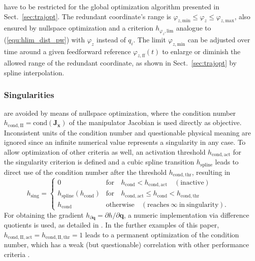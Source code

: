 \documentclass[runningheads]{llncs}
\newcommand{\bm}[1]{\boldsymbol{#1}}
\begin{document}
have to be restricted for the global optimization algorithm presented in Sect.~\ref{sec:trajopt}.
The redundant coordinate's range is $\varphi_{z,\mathrm{min}} \le \varphi_z \le \varphi_{z,\mathrm{max}}$, also ensured by nullspace optimization and a criterion $h_{\varphi_{z},\mathrm{lim}}$ analogue to (\ref{equ:hlim_dist_pw}) with $\varphi_z$ instead of $q_i$.
The limit $\varphi_{z,\mathrm{min}}$ can be adjusted over time around a given feedforward reference $\varphi_{z,\mathrm{ff}}(t)$ to enlarge or diminish the allowed range of the redundant coordinate, as shown in Sect.~\ref{sec:trajopt} by spline interpolation.

\subsubsection{Singularities}

are avoided by means of nullspace optimization, where the condition number $h_{\mathrm{cond,II}}=\mathrm{cond}(\bm{J}_{\bm{x}})$ of the manipulator Jacobian is used directly as objective.
Inconsistent units of the condition number and questionable physical meaning \cite{Merlet2006,KotlarskiDoHeiOrt2010} are ignored since an infinite numerical value represents a singularity in any case.
To allow optimization of other criteria as well, an activation threshold $h_{\mathrm{cond,act}}$ for the singularity criterion is defined and a cubic spline transition $h_{\mathrm{spline}}$ leads to direct use of the condition number after the threshold $h_{\mathrm{cond,thr}}$, resulting in
%
\begin{equation}
h_{\mathrm{sing}}
=
\begin{cases} 
0 & \mathrm{for} \quad h_{\mathrm{cond}} < h_{\mathrm{cond,act}} \quad \mathrm{(inactive)} \\
h_{\mathrm{spline}}(h_{\mathrm{cond}}) & \mathrm{for} \quad h_{\mathrm{cond,act}} \leq h_{\mathrm{cond}} < h_{\mathrm{cond,thr}} \\
h_{\mathrm{cond}} & \mathrm{otherwise} \quad \mathrm{(reaches~\infty~in~singularity)}.
\end{cases}
\label{equ:hcond_dist_pw}
\end{equation}
%
For obtaining the gradient $h_{\partial \bm{q}} {=} \partial h / \partial \bm{q}$, a numeric implementation via difference quotients is used, as detailed in \cite{SchapplerOrt2021}.
In the further examples of this paper, $h_{\mathrm{cond,II,act}}{=}h_{\mathrm{cond,II,thr}}{=}1$ leads to a permanent optimization of the condition number, which has a weak (but questionable) correlation with other performance criteria \cite{Merlet2006}.
\end{document}
